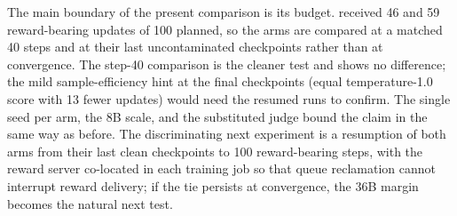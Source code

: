 The main boundary of the present comparison is its budget. \foldgrpo{} received 46 and \grpo{}
59 reward-bearing updates of 100 planned, so the arms are compared at a matched 40 steps and
at their last uncontaminated checkpoints rather than at convergence. The step-40 comparison
is the cleaner test and shows no difference; the mild sample-efficiency hint at the final
checkpoints (equal temperature-1.0 score with 13 fewer updates) would need the resumed runs to
confirm. The single seed per arm, the 8B scale, and the substituted judge bound the claim in
the same way as before. The discriminating next experiment is a resumption of both arms from
their last clean checkpoints to 100 reward-bearing steps, with the reward server co-located in
each training job so that queue reclamation cannot interrupt reward delivery; if the tie
persists at convergence, the 36B margin becomes the natural next test.
